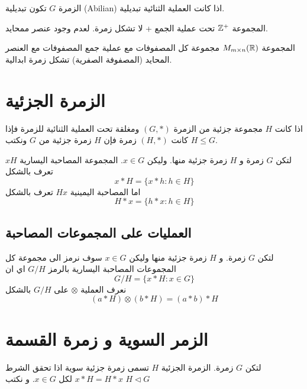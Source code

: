 \begin{definition}
	الزمرة $G$ تكون تبديلية (Abilian) اذا كانت العملية الثنائية تبديلية.
\end{definition}

\begin{example}
	المجموعة $\mathbb{Z}^+$ تحت عملية الجمع + لا تشكل زمرة. لعدم وجود عنصر ممحايد.
\end{example}

\begin{example}
	المجموعة $M_{m\times n}(\mathbb{R})$ مجموعة كل المصفوفات مع عملية جمع المصفوفات مع العنصر المحايد (المصفوفة الصفرية) تشكل زمرة ابدالية.
\end{example}

\section{الزمرة الجزئية}

\begin{definition}
	اذا كانت $H$ مجموعة جزئية من الزمرة $(G, *)$ ومغلقة تحت العملية الثنائية للزمرة فإذا كانت $(H, *)$ زمرة فإن $H$ زمرة جزئية من $G$ ونكتب $H\leq G$.
\end{definition}

\begin{definition}
	لتكن $G$ زمرة و $H$ زمرة جزئية منها. وليكن $x\in G$. المجموعة المصاحبة اليسارية $xH$ تعرف بالشكل
	\[
	x*H = \{x*h : h \in H\}
	\]
	اما المصاحبة اليمينية $Hx$ تعرف بالشكل
	\[
	H*x = \{ h*x : h\in H\} 
	\]
\end{definition}

\subsection*{العمليات على المجموعات المصاحبة \cite{abstract_algebra3}}
لتكن $G$ زمرة. و $H$ زمرة جزئية منها وليكن $x\in G$ سوف نرمز الى مجموعة كل المجموعات المصاحبة اليسارية بالرمز $G/H$ اي ان 
\[
G/H = \{x*H : x\in G\}
\]
نعرف العملية $\otimes$ على $G/H$ بالشكل
\[
(a*H)\otimes(b*H) = (a*b)*H
\]

\section{الزمر السوية و زمرة القسمة}

\begin{definition}
	لتكن $G$ زمرة. الزمرة الجزئية $H$ تسمى زمرة جزئية سوية اذا تحقق الشرط $x * H = H * x$ لكل $x\in G$. و نكتب $H \triangleleft G$
\end{definition}

